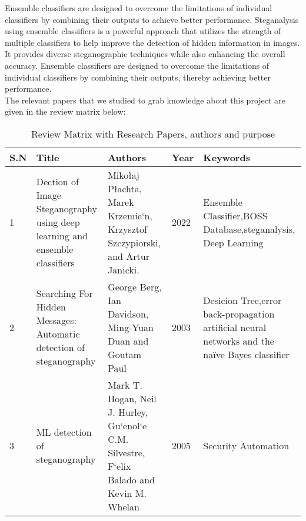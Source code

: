 Ensemble classifiers are designed to overcome the limitations of individual classifiers by combining their outputs to achieve better performance. Steganalysis using ensemble classifiers is a powerful approach that utilizes the strength of multiple classifiers to help improve the detection of hidden information in images. It provides diverse steganographic techniques while also enhancing the overall accuracy. Ensemble classifiers are designed to overcome the limitations of individual classifiers by combining their outputs, thereby achieving better performance.\\
The relevant papers that we studied to grab knowledge about this project are given in the review matrix below:
 \begin{table}[h!]
    \begin{tabular}{|p{2.5cm}|p{2.5cm}|p{2.5cm}|p{2.5cm}|p{4cm}|}
    \hline
    S.N& Title& Authors& Year & Keywords\\
    \hline
    1&Dection of Image Steganography using deep learning and ensemble classifiers&Mikołaj Płachta, Marek Krzemie`n, Krzysztof Szczypiorski, and Artur Janicki.&2022& Ensemble Classifier,BOSS Database,steganalysis, Deep Learning\\
    \hline
    2&Searching For Hidden Messages: Automatic detection of steganography&George Berg, Ian Davidson, Ming-Yuan Duan and Goutam Paul&2003& Desicion Tree,error back-propagation artificial neural networks and the naïve Bayes classifier\\
    \hline
    3&ML detection of steganography&Mark T. Hogan, Neil J. Hurley, Gu`enol`e C.M. Silvestre, F`elix Balado and Kevin M. Whelan&2005&Security Automation\\
    \hline
    \end{tabular}
    \caption{Review Matrix with Research Papers, authors and purpose}
\end{table}
